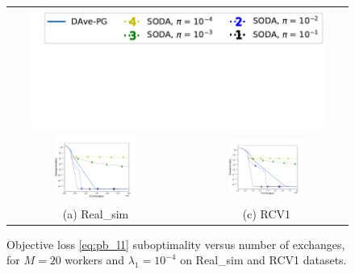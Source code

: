 \begin{figure}[t!]
\begin{tabular}{cc}
\multicolumn{2}{c}{\vspace{-4pt}\includegraphics[width = 0.9\textwidth]{SODA/Figs/legend.pdf}}\vspace*{-100pt}\\
\includegraphics[width = 0.5\textwidth]{SODA/Figs/real-sim_20w_00001_0001_fun_vs_ex_log.pdf} & 
\includegraphics[width = 0.5\textwidth]{SODA/Figs/rcv_20w_00001_0001_fun_vs_ex_log.pdf}\\
(a) Real\_sim & (c) RCV1
\end{tabular}
    \caption{Objective loss \eqref{eq:pb_l1} suboptimality versus number of exchanges, for $M=20$ workers and $\lambda_1 = 10^{-4}$ on Real\_sim  and RCV1 datasets.}
    \label{fig:communication}
\end{figure}
